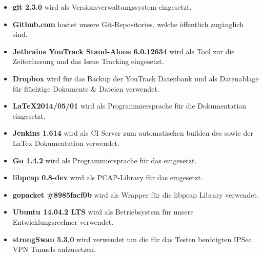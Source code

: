 \begin{itemize}
  \item \textbf{git 2.3.0} \newline wird als Versionsverwaltungssystem eingesetzt.
  \item \textbf{Github.com} \newline hostet unsere Git-Repositories, welche öffentlich zugänglich sind.
  \item \textbf{Jetbrains YouTrack Stand-Alone 6.0.12634} \newline wird als Tool zur die Zeiterfassung und das Issue Tracking eingesetzt.
  \item \textbf{Dropbox} \newline wird für das Backup der YouTrack Datenbank und als Datenablage für flüchtige Dokumente \& Dateien verwendet.
  \item \textbf{\LaTeX  2014/05/01} \newline wird als Programmiersprache für die Dokumentation eingesetzt.
  \item \textbf{Jenkins 1.614} \newline wird als \acl{CI} Server zum automatischen builden des \tool sowie der LaTex Dokumentation verwendet.
  \item \textbf{Go 1.4.2} \newline wird als Programmiersprache für das \tool eingesetzt.
  \item \textbf{libpcap 0.8-dev} \newline wird als \acs{PCAP}-Library für das \tool eingesetzt.
  \item \textbf{gopacket \#8985facf0b} \newline wird als Wrapper für die libpcap Library verwendet.
  \item \textbf{Ubuntu 14.04.2 LTS} \newline wird als Betriebsystem für unsere Entwicklungsrechner verwendet.
  \item \textbf{strongSwan 5.3.0} \newline wird verwendet um die für das Testen benötigten \acs{IPSec} \acs{VPN} Tunnels aufzusetzen.
\end{itemize}